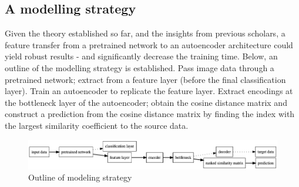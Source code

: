 \subsection{A modelling strategy}
Given the theory established so far, and the insights from previous scholars, a feature transfer from a pretrained network to an autoencoder architecture could yield robust results - and significantly decrease the training time.
Below, an outline of the modelling strategy is established.
Pass image data through a pretrained network; extract from a feature layer (before the final classification layer).
Train an autoencoder to replicate the feature layer. 
Extract encodings at the bottleneck layer of the autoencoder; obtain the cosine distance matrix and construct a prediction from the cosine distance matrix by finding the index with the largest similarity coefficient to the source data.

\begin{figure}[H]
    \centering
    \includegraphics[scale=0.35]{pictures/graphviz/project}
    \caption{Outline of modeling strategy}
    \label{fig:strategy}
\end{figure}


